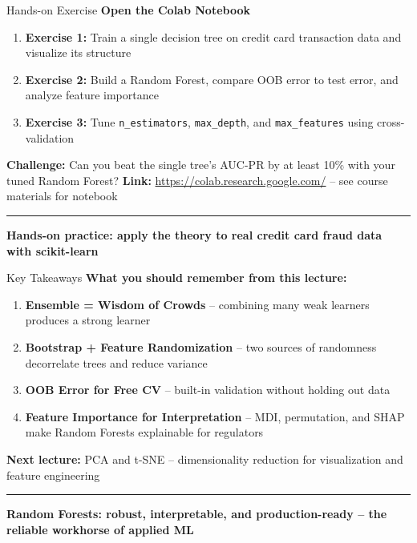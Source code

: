 \documentclass[8pt,aspectratio=169]{beamer}
\newcommand{\bottomnote}[1]{%
\vfill
\vspace{-2mm}
\textcolor{mllavender2}{\rule{\textwidth}{0.4pt}}
\vspace{1mm}
\footnotesize
\textbf{#1}
}
\newcommand{\highlight}[1]{\textcolor{mlorange}{\textbf{#1}}}
\begin{document}
\begin{frame}[t]{Hands-on Exercise}
\textbf{Open the Colab Notebook}
\begin{enumerate}
  \item \textbf{Exercise 1:} Train a single decision tree on credit card transaction data and visualize its structure
  \item \textbf{Exercise 2:} Build a Random Forest, compare OOB error to test error, and analyze feature importance
  \item \textbf{Exercise 3:} Tune \texttt{n\_estimators}, \texttt{max\_depth}, and \texttt{max\_features} using cross-validation
\end{enumerate}
\vspace{0.5em}
\textbf{Challenge:} Can you beat the single tree's AUC-PR by at least 10\% with your tuned Random Forest?
\vspace{0.5em}
\textbf{Link:} \url{https://colab.research.google.com/} -- see course materials for notebook
\bottomnote{Hands-on practice: apply the theory to real credit card fraud data with scikit-learn}
\end{frame}


\begin{frame}[t]{Key Takeaways}
\textbf{What you should remember from this lecture:}
\begin{enumerate}
  \item \highlight{Ensemble = Wisdom of Crowds} -- combining many weak learners produces a strong learner
  \item \highlight{Bootstrap + Feature Randomization} -- two sources of randomness decorrelate trees and reduce variance
  \item \highlight{OOB Error for Free CV} -- built-in validation without holding out data
  \item \highlight{Feature Importance for Interpretation} -- MDI, permutation, and SHAP make Random Forests explainable for regulators
\end{enumerate}
\vspace{0.5em}
\textbf{Next lecture:} PCA and t-SNE -- dimensionality reduction for visualization and feature engineering
\bottomnote{Random Forests: robust, interpretable, and production-ready -- the reliable workhorse of applied ML}
\end{frame}
\end{document}
